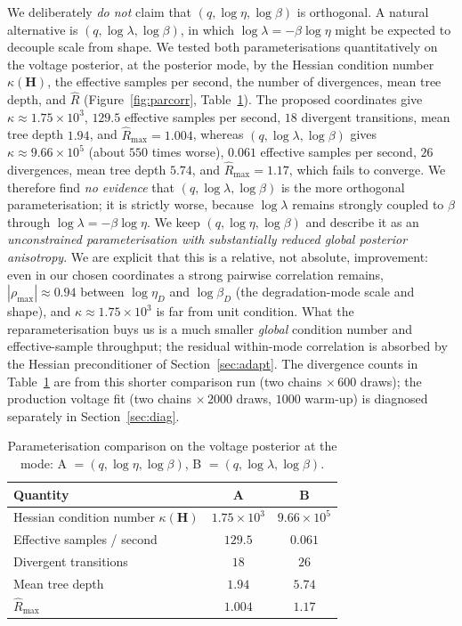 \documentclass[ASNA,twocolumn]{USG}
\begin{document}
We deliberately \emph{do not} claim that $(q,\log\eta,\log\beta)$ is
orthogonal. A natural alternative is $(q,\log\lambda,\log\beta)$, in which
$\log\lambda=-\beta\log\eta$ might be expected to decouple scale from
shape. We tested both parameterisations quantitatively on the voltage
posterior, at the posterior mode, by the Hessian condition number
$\kappa(\bm H)$, the effective samples per second, the number of
divergences, mean tree depth, and $\hat R$ (Figure~\ref{fig:parcorr},
Table~\ref{tab:parparam}). The proposed coordinates give
$\kappa\approx1.75\times10^{3}$, $129.5$ effective samples per second,
$18$ divergent transitions, mean tree depth $1.94$, and $\hat R_{\max}=1.004$,
whereas $(q,\log\lambda,\log\beta)$ gives $\kappa\approx9.66\times10^{5}$
(about $550$ times worse), $0.061$ effective samples per second, $26$
divergences, mean tree depth $5.74$, and $\hat R_{\max}=1.17$, which
fails to converge. We therefore find \emph{no evidence} that
$(q,\log\lambda,\log\beta)$ is the more orthogonal parameterisation; it is
strictly worse, because $\log\lambda$ remains strongly coupled to $\beta$
through $\log\lambda=-\beta\log\eta$. We keep $(q,\log\eta,\log\beta)$ and
describe it as an \emph{unconstrained parameterisation with substantially
reduced global posterior anisotropy}. We are explicit that this is a
relative, not absolute, improvement: even in our chosen coordinates a strong
pairwise correlation remains, $|\rho_{\max}|\approx0.94$ between
$\log\eta_D$ and $\log\beta_D$ (the degradation-mode scale and shape), and
$\kappa\approx1.75\times10^{3}$ is far from unit condition. What the
reparameterisation buys us is a much smaller \emph{global} condition number
and effective-sample throughput; the residual within-mode correlation is
absorbed by the Hessian preconditioner of Section~\ref{sec:adapt}. The
divergence counts in Table~\ref{tab:parparam} are from this shorter
comparison run (two chains $\times\,600$ draws); the production voltage fit
(two chains $\times\,2000$ draws, $1000$ warm-up) is diagnosed separately
in Section~\ref{sec:diag}.

\begin{table}[h]
\centering
\caption{Parameterisation comparison on the voltage posterior at the mode:
A $=(q,\log\eta,\log\beta)$, B $=(q,\log\lambda,\log\beta)$.}
\label{tab:parparam}
\small
\begin{tabular}{lcc}
\toprule
Quantity & A & B\\
\midrule
Hessian condition number $\kappa(\bm H)$ & $1.75\times10^{3}$ & $9.66\times10^{5}$\\
Effective samples / second & $129.5$ & $0.061$\\
Divergent transitions & $18$ & $26$\\
Mean tree depth & $1.94$ & $5.74$\\
$\hat R_{\max}$ & $1.004$ & $1.17$\\
\bottomrule
\end{tabular}
\end{table}
\end{document}
